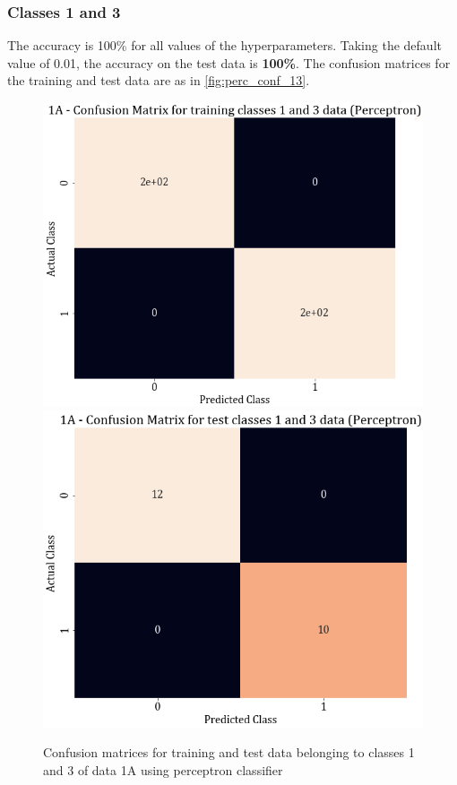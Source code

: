 \documentclass[11pt,a4paper]{article}
\begin{document}
\subsubsection{Classes 1 and 3}

The accuracy is 100\% for all values of the hyperparameters. Taking the default value of 0.01, the accuracy on the test data is \textbf{100\%}. The confusion matrices for the training and test data are as in \autoref{fig:perc_conf_13}.
\begin{figure}[H]
    \centering
    \includegraphics[scale=0.35]{images/1A_perceptron_training_classes_1_and_3_confmat.png}
    \includegraphics[scale=0.35]{images/1A_perceptron_test_classes_1_and_3_confmat.png}
    \caption{Confusion matrices for training and test data belonging to classes 1 and 3 of data 1A using perceptron classifier}
    \label{fig:perc_conf_13}
\end{figure}
\end{document}
